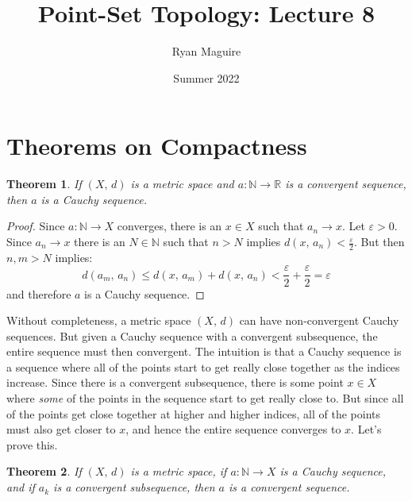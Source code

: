 \documentclass{article}
\title{Point-Set Topology: Lecture 8}
\author{Ryan Maguire}
\date{Summer 2022}
\theoremstyle{plain}
\newtheorem{theorem}{Theorem}[section]
\begin{document}
    \maketitle
    \section{Theorems on Compactness}
        \begin{theorem}
            If $(X,\,d)$ is a metric space and
            $a:\mathbb{N}\rightarrow\mathbb{R}$ is a convergent sequence,
            then $a$ is a Cauchy sequence.
        \end{theorem}
        \begin{proof}
            Since $a:\mathbb{N}\rightarrow{X}$ converges, there is an
            $x\in{X}$ such that $a_{n}\rightarrow{x}$. Let
            $\varepsilon>0$. Since $a_{n}\rightarrow{x}$ there is an
            $N\in\mathbb{N}$ such that $n>N$ implies
            $d(x,\,a_{n})<\frac{\varepsilon}{2}$. But then $n,m>N$ implies:
            \begin{equation}
                d(a_{m},\,a_{n})\leq{d}(x,\,a_{m})+d(x,\,a_{n})
                    <\frac{\varepsilon}{2}+\frac{\varepsilon}{2}
                    =\varepsilon
            \end{equation}
            and therefore $a$ is a Cauchy sequence.
        \end{proof}
        Without completeness, a metric space $(X,\,d)$ can have non-convergent
        Cauchy sequences. But given a Cauchy sequence with a convergent
        subsequence, the entire sequence must then convergent. The intuition is
        that a Cauchy sequence is a sequence where all of the points start to
        get really close together as the indices increase. Since there is a
        convergent subsequence, there is some point $x\in{X}$ where
        \textit{some} of the points in the sequence start to get really close
        to. But since all of the points get close together at higher and higher
        indices, all of the points must also get closer to $x$, and hence the
        entire sequence converges to $x$. Let's prove this.
        \begin{theorem}
            If $(X,\,d)$ is a metric space, if $a:\mathbb{N}\rightarrow{X}$
            is a Cauchy sequence, and if $a_{k}$ is a convergent subsequence,
            then $a$ is a convergent sequence.
        \end{theorem}
\end{document}
